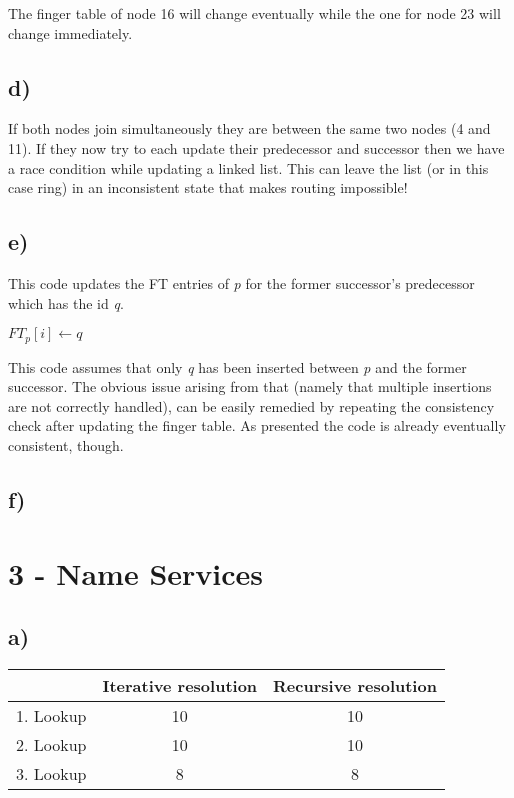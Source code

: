\documentclass{scrartcl}
\begin{document}
The finger table of node 16 will change eventually while the one for node 23 will change immediately.

\subsection*{d)}
If both nodes join simultaneously they are between the same two nodes (4 and 11). 
If they now try to each update their predecessor and successor then we have a race condition while updating a linked list. 
This can leave the list (or in this case ring) in an inconsistent state that makes routing impossible!

\subsection*{e)}

This code updates the FT entries of \textit{p} for the former successor's predecessor which has the id \textit{q}.

\begin{algorithm}
\begin{algorithmic}
	   \State $FT_p[i] \gets q$
	\EndFor
\end{algorithmic}
\end{algorithm}

This code assumes that only \textit{q} has been inserted between \textit{p} and the former successor.
The obvious issue arising from that (namely that multiple insertions are not correctly handled), can be easily remedied by repeating the consistency check after updating the finger table.
As presented the code is already eventually consistent, though.

\subsection*{f)}

\section*{3 - Name Services}

\subsection*{a)}
\begin{center}
	\begin{tabular}{|c|c|c|}
		\hline
		& Iterative resolution & Recursive resolution \\ \hline
		1. Lookup & 10 & 10 \\ \hline
		2. Lookup & 10 & 10 \\ \hline
		3. Lookup & 8 & 8 \\ \hline
	\end{tabular}
\end{center}
\end{document}
